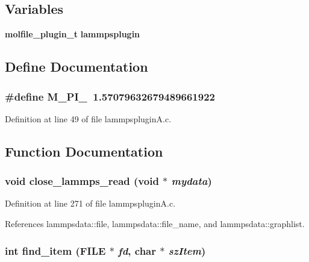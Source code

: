 \subsection*{Variables}
\begin{CompactItemize}
\item 
{\bf molfile\_\-plugin\_\-t} {\bf lammpsplugin}
\end{CompactItemize}


\subsection{Define Documentation}
\subsubsection{\setlength{\rightskip}{0pt plus 5cm}\#define M\_\-PI\_\ 1.57079632679489661922}\label{lammpspluginA_8c_a0}




Definition at line 49 of file lammpsplugin\-A.c.

\subsection{Function Documentation}
\subsubsection{\setlength{\rightskip}{0pt plus 5cm}void close\_\-lammps\_\-read (void $\ast$ {\em mydata})\hspace{0.3cm}{\tt  [static]}}\label{lammpspluginA_8c_a7}




Definition at line 271 of file lammpsplugin\-A.c.

References lammpsdata::file, lammpsdata::file\_\-name, and lammpsdata::graphlist.
\subsubsection{\setlength{\rightskip}{0pt plus 5cm}int find\_\-item (FILE $\ast$ {\em fd}, char $\ast$ {\em sz\-Item})\hspace{0.3cm}{\tt  [static]}}\label{lammpspluginA_8c_a3}




